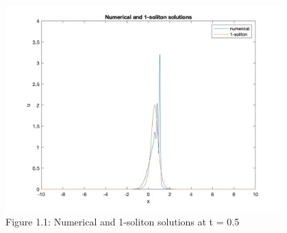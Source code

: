 \documentclass[a4paper,11pt]{article}
\begin{document}
\begin{figure}[H]
 \center
 \includegraphics[width = 0.9\linewidth, height =8cm]{Q2.jpg}
 \caption{Figure 1.1: Numerical and 1-soliton solutions at t = 0.5}
\end{figure}
\newpage
\end{document}
